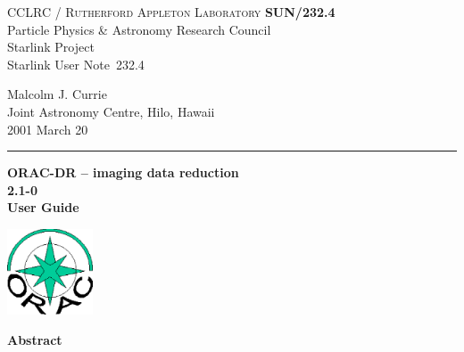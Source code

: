 \documentclass[twoside,11pt]{article}
\newcommand{\stardoccategory}  {Starlink User Note}
\newcommand{\stardocinitials}  {SUN}
\newcommand{\stardocnumber}    {232.4}
\newcommand{\stardocauthors}   {Malcolm J. Currie\\
                               Joint Astronomy Centre, Hilo, Hawaii}
\newcommand{\stardocdate}      {2001 March 20}
\newcommand{\stardoctitle}     {ORAC-DR -- imaging data reduction}
\newcommand{\stardocversion}   {2.1-0}
\newcommand{\stardocmanual}    {User Guide}
\newcommand{\stardocname}{\stardocinitials /\stardocnumber}
\newenvironment{latexonly}{}{}
\renewcommand{\_}{\texttt{\symbol{95}}}
\begin{document}
\thispagestyle{empty}

\begin{latexonly}
   CCLRC / \textsc{Rutherford Appleton Laboratory} \hfill \textbf{\stardocname}\\
   {\large Particle Physics \& Astronomy Research Council}\\
   {\large Starlink Project\\}
   {\large \stardoccategory\ \stardocnumber}
   \begin{flushright}
   \stardocauthors\\
   \stardocdate
   \end{flushright}
   \vspace{-4mm}
   \rule{\textwidth}{0.5mm}
   \vspace{5mm}
   \begin{center}
   {\Huge\textbf{\stardoctitle \\ [2.5ex]}}
   {\LARGE\textbf{\stardocversion \\ [4ex]}}
   {\Huge\textbf{\stardocmanual}}
   \end{center}
   \vspace{5mm}

\begin{center}
\includegraphics[width=1.0in]{sun232_logo.eps}
\end{center}

   \vspace{10mm}
   \begin{center}
      {\Large\textbf{Abstract}}
   \end{center}
\end{latexonly}
\end{document}
